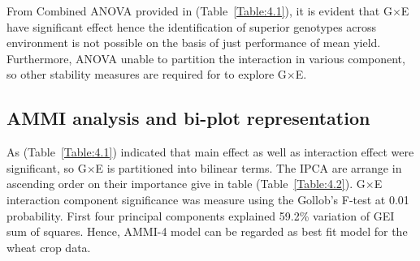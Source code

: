 From Combined ANOVA provided in (Table~\ref{Table:4.1}), it is evident that G$\times$E have significant effect hence the identification of superior genotypes across environment is not possible on the basis of just performance of mean yield. Furthermore, ANOVA unable to partition the interaction in various component, so other stability measures are required for to explore G$\times$E.

\subsection{AMMI analysis and bi-plot representation}
As (Table~\ref{Table:4.1}) indicated  that main effect as well as interaction effect were significant, so G$\times$E is partitioned into bilinear terms. The IPCA are arrange in ascending order on their importance give in table (Table~\ref{Table:4.2}).  G$\times$E  interaction component significance was measure using the Gollob's F-test at 0.01 probability. First four principal components explained 59.2\% variation of GEI sum of squares. Hence, AMMI-4 model can be regarded as best fit model for the wheat crop data. 
 

